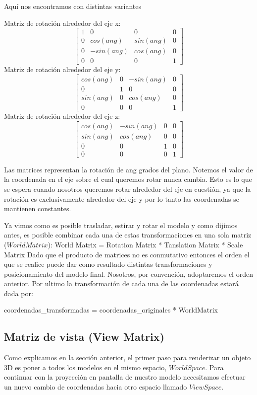 \documentclass[a4paper]{article}
\begin{document}
Aquí nos encontramos con distintas variantes 
 
Matriz de rotación alrededor del eje x:
\[
\begin{bmatrix}
1 & 0 & 0 & 0 \\
0 & cos(ang) & sin(ang) & 0 \\
0 & -sin(ang) & cos(ang) & 0 \\
0 & 0 & 0 & 1  
\end{bmatrix}
\]
Matriz de rotación alrededor del eje y:
\[
\begin{bmatrix}
cos(ang) & 0 & -sin(ang) & 0 \\
0 & 1 & 0 & 0 \\
sin(ang) & 0 & cos(ang) & 0 \\
0 & 0 & 0 & 1  
\end{bmatrix}
\]
Matriz de rotación alrededor del eje z:
\[
\begin{bmatrix}
cos(ang) & -sin(ang) & 0 & 0 \\
sin(ang) & cos(ang) & 0 & 0 \\
0 & 0 & 1 & 0 \\
0 & 0 & 0 & 1  
\end{bmatrix}
\]


Las  matrices representan  la rotación de ang grados del plano. Notemos el valor de la coordenada en el eje sobre el cual queremos rotar nunca cambia. Esto es lo que se espera cuando nosotros queremos rotar alrededor del eje en cuestión, ya que  la rotación es exclusivamente alrededor del eje y por lo tanto las coordenadas se mantienen constantes.

\par Ya vimos como es posible trasladar, estirar y rotar el modelo y como dijimos antes, es posible combinar cada una de estas transformaciones en una sola matriz ($World Matrix$): \newline
World Matrix = Rotation Matrix * Tanslation Matrix * Scale Matrix\newline  \newline
 Dado que el producto de matrices no es conmutativo entonces el orden el que se realice puede dar como resultado distintas transformaciones y posicionamiento del modelo final. Nosotros, por convención, adoptaremos el orden anterior.
Por ultimo la transformación de cada una de las coordenadas estará dada por: \newline

coordenadas\_transformadas = coordenadas\_originales * WorldMatrix 


\subsection{Matriz de vista (View Matrix)}
Como explicamos en la sección anterior, el primer paso para  renderizar un objeto 3D  es poner a todos los modelos en el mismo espacio, $World Space$. Para continuar con la proyección en pantalla de nuestro modelo necesitamos efectuar un nuevo cambio de coordenadas hacia otro espacio llamado $View Space$.
\end{document}
